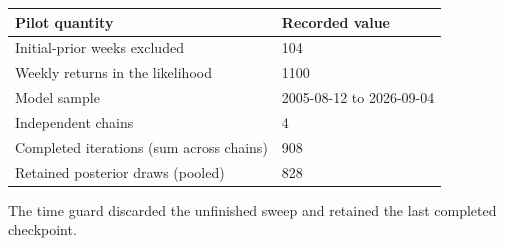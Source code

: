 \par\medskip\noindent
{\small
\begin{tabular}{@{}p{.58\linewidth}p{.34\linewidth}@{}}
\toprule
Pilot quantity & Recorded value\\
\midrule
Initial-prior weeks excluded & 104\\
Weekly returns in the likelihood & 1100\\
Model sample & 2005-08-12 to 2026-09-04\\
Independent chains & 4\\
Completed iterations (sum across chains) & 908\\
Retained posterior draws (pooled) & 828\\
\bottomrule
\end{tabular}
}
\par\medskip
\small The time guard discarded the unfinished sweep and retained the last completed checkpoint.
